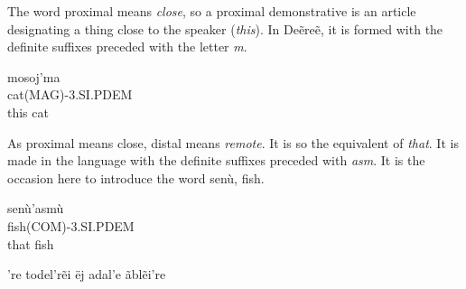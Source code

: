 The word proximal means \emph{close}, so a proximal demonstrative is an article designating a thing
close to the speaker (\emph{this}). In Deẽreẽ, it is formed with the definite suffixes preceded with
the letter \emph{m}.

\begin{exe}
\ex\label{exe:person-prox-dem}
\gll mosoj’ma\\
cat(MAG)-3.SI.PDEM\\
\trans this cat
\end{exe}

As proximal means close, distal means \emph{remote}. It is so the equivalent of \emph{that}. It is
made in the language with the definite suffixes preceded with \emph{asm}. It is the occasion here to
introduce the word \gls{senù}, fish.

\begin{exe}
\ex\label{exe:person-dist-dem}
\gll \gls{senù}’asmù\\
fish(COM)-3.SI.PDEM\\
\trans that fish
\end{exe}

’re
todel’rẽi
ëj adal’e ãblẽi’re

